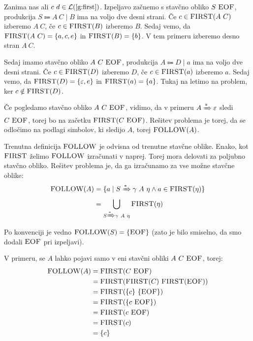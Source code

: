 \documentclass{article}
\newcommand{\FIRST}{\textsc{FIRST}}
\newcommand{\FOLLOW}{\textsc{FOLLOW}}
\newcommand{\EOF}{\textsc{EOF}}
\newcommand{\Null}{\varepsilon}
\newcommand{\Language}[1]{\mathcal{L}(#1)}
\newcommand{\Arrow}{\Coloneqq}
\newcommand{\DeriveStar}{\xRightarrow{\ast}}
\newcommand{\Seq}{\ }
\newcommand{\Union}{\mathrel{|}}
\begin{document}
Zanima nas ali $c \Seq d \in \Language{\text{\ref{g:first}}}$.
Izpeljavo začnemo s stavčno obliko $S \Seq \EOF$, produkcija $S \Arrow A \Seq C \Union B$ ima na voljo dve desni strani.
Če $c \in \FIRST(A \Seq C)$ izberemo $A \Seq C$, če $c \in \FIRST(B)$ izberemo $B$.
Sedaj vemo, da $\FIRST(A \Seq C) = \{a, c, e\}$ in $\FIRST(B) = \{b\}$.
V tem primeru izberemo desno stran $A \Seq C$.

Sedaj imamo stavčno obliko $A \Seq C \Seq \EOF$, produkcija $A \Arrow D \Union a$ ima na voljo dve desni strani.
Če $c \in \FIRST(D)$ izberemo $D$, če $c \in \FIRST(a)$ izberemo $a$.
Sedaj vemo, da $\FIRST(D) = \{\Null, e\}$ in $\FIRST(a) = \{a\}$.
Tukaj na letimo na problem, ker $c \notin \FIRST(D)$.

Če pogledamo stavčno obliko $A \Seq C \Seq \EOF$, vidimo, da v primeru $A \DeriveStar \varepsilon$ sledi $C \Seq \EOF$, torej bo na začetku $\FIRST(C \Seq \EOF)$.
Rešitev problema je torej, da se odločimo na podlagi simbolov, ki sledijo $A$, torej $\FOLLOW(A)$.

Trenutna definicija $\FOLLOW$ je odvisna od trenutne stavčne oblike.
Enako, kot $\FIRST$ želimo $\FOLLOW$ izračunati v naprej.
Torej mora delovati za poljubno stavčno obliko.
Rešitev problema je, da ga izračunamo za vse možne stavčne oblike:
\begin{align*}
  \FOLLOW(A) &= \{a \mid S \DeriveStar \gamma \Seq A \Seq \eta \land a \in \FIRST(\eta)\}\\
  &= \bigcup_{S \DeriveStar \gamma \Seq A \Seq \eta} \FIRST(\eta)
\end{align*}
Po konvenciji je vedno $\FOLLOW(S) = \{\EOF\}$ (zato je bilo smiselno, da smo dodali $\EOF$ pri izpeljavi).

V primeru, se $A$ lahko pojavi samo v eni stavčni obliki $A \Seq C \Seq \EOF$, torej:
\begin{align*}
  \FOLLOW(A) &= \FIRST(C \Seq \EOF) \\
             &= \FIRST(\FIRST(C) \Seq \FIRST(\EOF))\\
             &= \FIRST(\{c\} \Seq \{\EOF\})\\
             &= \FIRST(\{c \Seq \EOF\})\\
             &= \FIRST(c \Seq \EOF) \\
             &= \FIRST(c)\\
             &= \{c\}
\end{align*}
\end{document}
